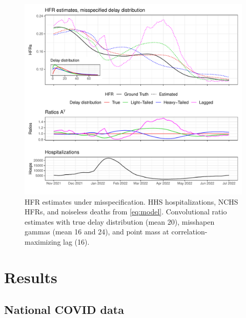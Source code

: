 \documentclass{article}
\begin{document}
\begin{figure}
    \centering
    \includegraphics[width=.8\linewidth]{Figs/Simulated/toy_misp.pdf}
    \caption{HFR estimates under misspecification. HHS hospitalizations, NCHS HFRs, and noiseless deaths from \eqref{eq:model}. Convolutional ratio estimates with true delay distribution (mean 20), misshapen gammas (mean 16 and 24), and point mass at correlation-maximizing lag (16).}%
    \label{fig:misspecified}
\end{figure}


\section{Results}\label{sec:results}

\subsection{National COVID data}\label{sec:results_real}
\end{document}
